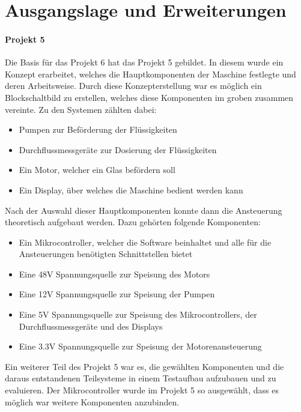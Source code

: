 \section{Ausgangslage und Erweiterungen}
\label{sec:Ausgangslage und Erweiterungen}

\paragraph{Projekt 5}\mbox{}

Die Basis für das Projekt 6 hat das Projekt 5 gebildet. In diesem wurde ein Konzept erarbeitet, welches die Hauptkomponenten der Maschine festlegte und deren Arbeitsweise. Durch diese Konzepterstellung war es möglich ein Blockschaltbild zu erstellen, welches diese Komponenten im groben zusammen vereinte. Zu den Systemen zählten dabei: 

\begin{itemize}
\item Pumpen zur Beförderung der Flüssigkeiten
\item Durchflussmessgeräte zur Dosierung der Flüssigkeiten
\item Ein Motor, welcher ein Glas befördern soll
\item Ein Display, über welches die Maschine bedient werden kann
\end{itemize}
\mbox{}

Nach der Auswahl dieser Hauptkomponenten konnte dann die Ansteuerung theoretisch aufgebaut werden. Dazu gehörten folgende Komponenten:

\begin{itemize}
\item Ein Mikrocontroller, welcher die Software beinhaltet und alle für die Ansteuerungen benötigten Schnittstellen bietet 
\item Eine 48V Spannungsquelle zur Speisung des Motors
\item Eine 12V Spannungsquelle zur Speisung der Pumpen
\item Eine 5V Spannungsquelle zur Speisung des Mikrocontrollers, der Durchflussmessgeräte und des Displays
\item Eine 3.3V Spannungsquelle zur Speisung der Motorenansteuerung
\end{itemize}
\mbox{}

Ein weiterer Teil des Projekt 5 war es, die gewählten Komponenten und die daraus entstandenen Teilsysteme in einem Testaufbau aufzubauen und zu evaluieren. Der Mikrocontroller wurde im Projekt 5 so ausgewählt, dass es möglich war weitere Komponenten anzubinden. 

